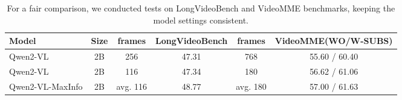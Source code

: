 
\begin{table*}[ht]
\caption{For a fair comparison, we conducted tests on LongVideoBench and VideoMME benchmarks, keeping the model settings consistent.}

\label{fair-compare}
\vskip 0.15in
\begin{center}
\begin{small}
\begin{sc}
\begin{tabular}{lccccc}
\toprule
Model & Size & frames & LongVideoBench & frames & VideoMME(WO/W-SUBS) \\
\midrule

Qwen2-VL & 2B & 256 & 47.31 & 768 & 55.60 / 60.40\\
Qwen2-VL & 2B & 116 & 47.34 & 180 & 56.62 / 61.06\\
Qwen2-VL-MaxInfo & 2B & avg. 116 & 48.77 & avg. 180 & 57.00 / 61.63\\

\bottomrule
\end{tabular}
\end{sc}
\end{small}
\end{center}
\vskip -0.1in
\end{table*}